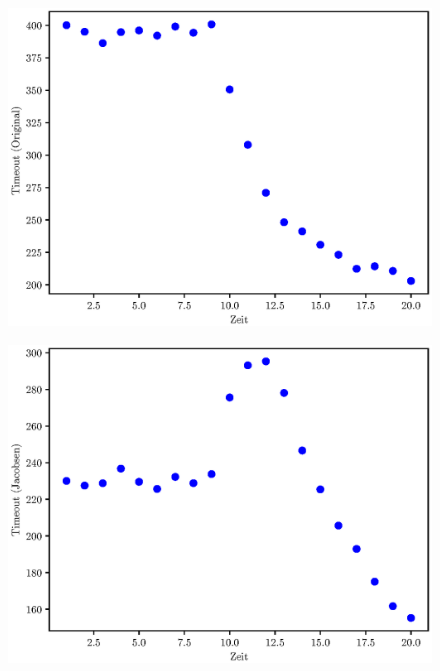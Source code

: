 \FloatBarrier

\begin{figure}[p]
    \centering
    \includegraphics[width=1\textwidth]{./assets/5.12.c.Zeit-Timeout-Original.eps}
    \caption{}
    \label{fig:5.12.c.Zeit-Timeout-Original}
\end{figure}

\begin{figure}[p]
    \centering
    \includegraphics[width=1\textwidth]{./assets/5.12.c.Zeit-Timeout-Jacobsen.eps}
    \caption{}
    \label{fig:5.12.c.Zeit-Timeout-Jacobsen}
\end{figure}

\FloatBarrier
